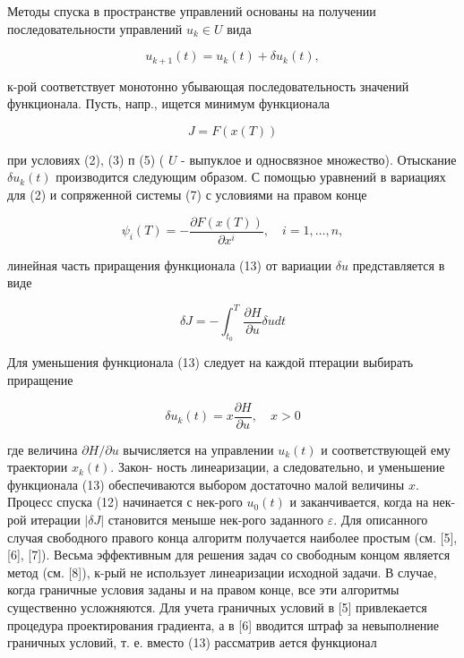 \documentclass[10pt]{article}
\begin{document}
Методы спуска в пространстве управлений основаны на получении последовательности управлений $u_{k} \in U$ вида



\[

u_{k+1}(t)=u_{k}(t)+\delta u_{k}(t),

\]



к-рой соответствует монотонно убывающая последовательность значений функционала. Пусть, напр., ищется минимум функционала



\[

J=F(x(T))

\]



при условиях (2), (3) п (5) ( $U$ - выпуклое и односвязное множество). Отыскание $\delta u_{k}(t)$ производится следующим образом. С помощью уравнений в вариациях для (2) и сопряженной системы (7) с условиями на правом конце



\[

\psi_{i}(T)=-\frac{\partial F(x(T))}{\partial x^{i}}, \quad i=1, \ldots, n,

\]



линейная часть приращения функционала (13) от вариации $\delta u$ представляется в виде



\[

\delta J=-\int_{t_{0}}^{T} \frac{\partial H}{\partial u} \delta u d t

\]



Для уменьшения функционала (13) следует на каждой птерации выбирать приращение



\[

\delta u_{k}(t)=x \frac{\partial H}{\partial u}, \quad x>0

\]



где величина $\partial H / \partial u$ вычисляется на управлении $u_{k}(t)$ и соответствующей ему траектории $x_{k}(t)$. Закон- ность линеаризации, а следовательно, и уменьшение функционала (13) обеспечиваются выбором достаточно малой величины $x$. Процесс спуска (12) начинается с нек-рого $u_{0}(t)$ и заканчивается, когда на нек-рой итерации $|\delta J|$ становится меныше нек-рого заданного $\varepsilon$. Для описанного случая свободного правого конца алгоритм получается наиболее простым (см. [5], [6], [7]). Весьма эффективным для решения задач со свободным концом является метод (см. [8]), к-рый не использует линеаризации исходной задачи. В случае, когда граничные условия заданы и на правом конце, все эти алгоритмы существенно усложняются. Для учета граничных условий в [5] привлекается процедура проектирования градиента, а в [6] вводится штраф за невыполнение граничных условий, т. е. вместо (13) рассматрив ается функционал
\end{document}
